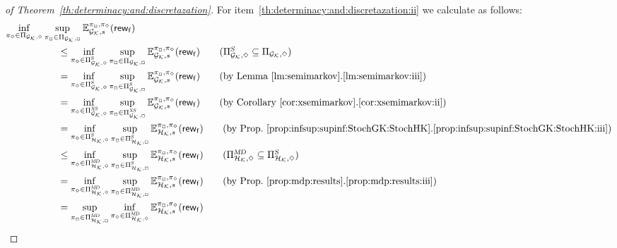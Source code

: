 \begin{proof}[of Theorem~\ref{th:determinacy:and:discretazation}]
  For item~\ref{th:determinacy:and:discretazation:ii} we calculate as follows:
  \begin{align*}
    \inf_{\strat_\minplay\in\Strategies{\StochGK,\minplay}}\sup_{\strat_\maxplay\in\Strategies{\StochGK,\maxplay}}\Expect^{\strat_{\maxplay},\strat_{\minplay}}_{\StochGK,s}(\GRewards)
    \hspace{-8em} &
    \\
    & \leq
    \inf_{\strat_\minplay\in\SemiMarkovStrats{\StochGK,\minplay}}\sup_{\strat_\maxplay\in\Strategies{\StochGK,\maxplay}}\Expect^{\strat_{\maxplay},\strat_{\minplay}}_{\StochGK,s}(\GRewards)
    \tag{$\SemiMarkovStrats{\StochGK,\minplay}\subseteq\Strategies{\StochGK,\minplay}$}\\
    & =
    \inf_{\strat_\minplay\in\SemiMarkovStrats{\StochGK,\minplay}}\sup_{\strat_\maxplay\in\SemiMarkovStrats{\StochGK,\maxplay}}\Expect^{\strat_{\maxplay},\strat_{\minplay}}_{\StochGK,s}(\GRewards)
    \tag{by Lemma~\ref{lm:semimarkov}.\ref{lm:semimarkov:iii}}\\
    & =
    \inf_{\strat_\minplay\in\XSemiMarkovStrats{\StochGK,\minplay}}\sup_{\strat_\maxplay\in\XSemiMarkovStrats{\StochGK,\maxplay}}\Expect^{\strat_{\maxplay},\strat_{\minplay}}_{\StochGK,s}(\GRewards)
    \tag{by Corollary~\ref{cor:xsemimarkov}.\ref{cor:xsemimarkov:ii}}\\
    & =
    \inf_{\strat_\minplay\in\SemiMarkovStrats{\StochHK,\minplay}}\sup_{\strat_\maxplay\in\SemiMarkovStrats{\StochHK,\maxplay}}\Expect^{\strat_{\maxplay},\strat_{\minplay}}_{\StochHK,s}(\GRewards)
    \tag{by Prop.~\ref{prop:infsup:supinf:StochGK:StochHK}.\ref{prop:infsup:supinf:StochGK:StochHK:iii}}\\
    & \leq
    \inf_{\strat_\minplay\in\DetMemorylessStrats{\StochHK,\minplay}}\sup_{\strat_\maxplay\in\SemiMarkovStrats{\StochHK,\maxplay}}\Expect^{\strat_{\maxplay},\strat_{\minplay}}_{\StochHK,s}(\GRewards)
    \tag{$\DetMemorylessStrats{\StochHK,\minplay}\subseteq\SemiMarkovStrats{\StochHK,\minplay}$}\\
    & =
    \inf_{\strat_\minplay\in\DetMemorylessStrats{\StochHK,\minplay}}\sup_{\strat_\maxplay\in\DetMemorylessStrats{\StochHK,\maxplay}}\Expect^{\strat_{\maxplay},\strat_{\minplay}}_{\StochHK,s}(\GRewards)
    \tag{by Prop.~\ref{prop:mdp:results}.\ref{prop:mdp:results:iii}}\\
    & =
    \sup_{\strat_\maxplay\in\DetMemorylessStrats{\StochHK,\maxplay}}\inf_{\strat_\minplay\in\DetMemorylessStrats{\StochHK,\minplay}}\Expect^{\strat_{\maxplay},\strat_{\minplay}}_{\StochHK,s}(\GRewards)

\end{align*}
\end{proof}
